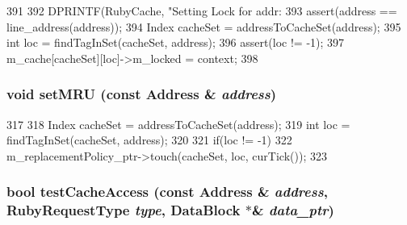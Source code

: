 \begin{DoxyCode}
391 {
392     DPRINTF(RubyCache, "Setting Lock for addr: %
393     assert(address == line_address(address));
394     Index cacheSet = addressToCacheSet(address);
395     int loc = findTagInSet(cacheSet, address);
396     assert(loc != -1);
397     m_cache[cacheSet][loc]->m_locked = context;
398 }
\end{DoxyCode}
\hypertarget{classCacheMemory_a82f197cef10db015c46d8e9f71275f47}{
\subsubsection[{setMRU}]{\setlength{\rightskip}{0pt plus 5cm}void setMRU (const {\bf Address} \& {\em address})}}
\label{classCacheMemory_a82f197cef10db015c46d8e9f71275f47}



\begin{DoxyCode}
317 {
318     Index cacheSet = addressToCacheSet(address);
319     int loc = findTagInSet(cacheSet, address);
320 
321     if(loc != -1)
322         m_replacementPolicy_ptr->touch(cacheSet, loc, curTick());
323 }
\end{DoxyCode}
\hypertarget{classCacheMemory_aba82772b79ad7b17d20d195979043473}{
\subsubsection[{testCacheAccess}]{\setlength{\rightskip}{0pt plus 5cm}bool testCacheAccess (const {\bf Address} \& {\em address}, \/  RubyRequestType {\em type}, \/  {\bf DataBlock} $\ast$\& {\em data\_\-ptr})}}
\label{classCacheMemory_aba82772b79ad7b17d20d195979043473}




